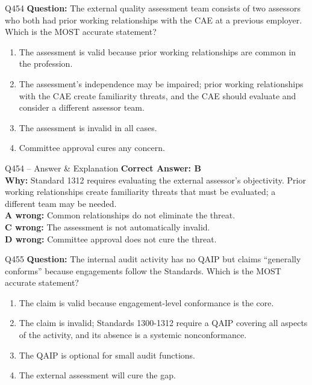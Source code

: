\documentclass[aspectratio=169,10pt]{beamer}
\begin{document}
	\begin{frame}[t]{Q454}
		\small
		\textbf{Question:} The external quality assessment team consists of two assessors who both had prior working relationships with the CAE at a previous employer. Which is the MOST accurate statement?
		\begin{enumerate}[label=\Alph*.,itemsep=1pt,topsep=2pt]
			\item The assessment is valid because prior working relationships are common in the profession.
			\item The assessment's independence may be impaired; prior working relationships with the CAE create familiarity threats, and the CAE should evaluate and consider a different assessor team.
			\item The assessment is invalid in all cases.
			\item Committee approval cures any concern.
		\end{enumerate}
	\end{frame}
	
	\begin{frame}[t]{Q454 -- Answer \& Explanation}
		\small
		\textbf{Correct Answer: B} \\[4pt]
		\textbf{Why:} Standard 1312 requires evaluating the external assessor's objectivity. Prior working relationships create familiarity threats that must be evaluated; a different team may be needed. \\[4pt]
		\textbf{A wrong:} Common relationships do not eliminate the threat. \\[2pt]
		\textbf{C wrong:} The assessment is not automatically invalid. \\[2pt]
		\textbf{D wrong:} Committee approval does not cure the threat.
	\end{frame}
	
	\begin{frame}[t]{Q455}
		\small
		\textbf{Question:} The internal audit activity has no QAIP but claims ``generally conforms'' because engagements follow the Standards. Which is the MOST accurate statement?
		\begin{enumerate}[label=\Alph*.,itemsep=1pt,topsep=2pt]
			\item The claim is valid because engagement-level conformance is the core.
			\item The claim is invalid; Standards 1300-1312 require a QAIP covering all aspects of the activity, and its absence is a systemic nonconformance.
			\item The QAIP is optional for small audit functions.
			\item The external assessment will cure the gap.
		\end{enumerate}
	\end{frame}
	
\end{document}
